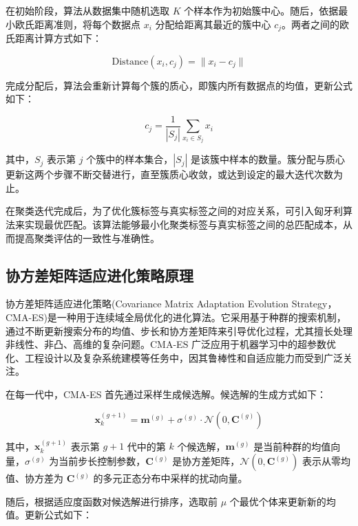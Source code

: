 \documentclass[master]{thesis-uestc}
\begin{document}
在初始阶段，算法从数据集中随机选取 \(K\) 个样本作为初始簇中心。随后，依据最小欧氏距离准则，将每个数据点 \(x_i\) 分配给距离其最近的簇中心 \(c_j\)。两者之间的欧氏距离计算方式如下：

\begin{equation}
\text{Distance}(x_i, c_j) = \| x_i - c_j \|
\end{equation}

完成分配后，算法会重新计算每个簇的质心，即簇内所有数据点的均值，更新公式如下：

\begin{equation}
c_j = \frac{1}{|S_j|} \sum_{x_i \in S_j} x_i
\end{equation}

其中，\(S_j\) 表示第 \(j\) 个簇中的样本集合，\(|S_j|\) 是该簇中样本的数量。簇分配与质心更新这两个步骤不断交替进行，直至簇质心收敛，或达到设定的最大迭代次数为止。

在聚类迭代完成后，为了优化簇标签与真实标签之间的对应关系，可引入匈牙利算法来实现最优匹配。该算法能够最小化聚类标签与真实标签之间的总匹配成本，从而提高聚类评估的一致性与准确性。
\FloatBarrier  %


\subsection{协方差矩阵适应进化策略原理}
协方差矩阵适应进化策略(Covariance Matrix Adaptation Evolution Strategy，CMA-ES)是一种用于连续域全局优化的进化算法。它采用基于种群的搜索机制，通过不断更新搜索分布的均值、步长和协方差矩阵来引导优化过程，尤其擅长处理非线性、非凸、高维的复杂问题。CMA-ES 广泛应用于机器学习中的超参数优化、工程设计以及复杂系统建模等任务中，因其鲁棒性和自适应能力而受到广泛关注。

在每一代中，CMA-ES 首先通过采样生成候选解。候选解的生成方式如下：

\begin{equation}
\mathbf{x}_k^{(g+1)} = \mathbf{m}^{(g)} + \sigma^{(g)} \cdot \mathcal{N}(0, \mathbf{C}^{(g)})
\label{eq:sample}
\end{equation}

其中，\(\mathbf{x}_k^{(g+1)}\) 表示第 \(g+1\) 代中的第 \(k\) 个候选解，\(\mathbf{m}^{(g)}\) 是当前种群的均值向量，\(\sigma^{(g)}\) 为当前步长控制参数，\(\mathbf{C}^{(g)}\) 是协方差矩阵，\(\mathcal{N}(0, \mathbf{C}^{(g)})\) 表示从零均值、协方差为 \(\mathbf{C}^{(g)}\) 的多元正态分布中采样的扰动向量。

随后，根据适应度函数对候选解进行排序，选取前 \(\mu\) 个最优个体来更新新的均值。更新公式如下：
\end{document}
